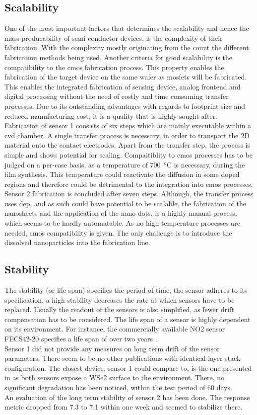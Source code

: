 \subsection{Scalability}
One of the most important factors that determines the scalability and hence the mass producability of semi conductor devices, is the complexity of their fabrication. With the complexity mostly originating from the count the different fabrication methods being used. Another criteria for good scalability is the compatibility to the \gls{cmos} fabrication process. This property enables the fabrication of the target device on the same wafer as \glspl{mosfet} will be fabricated. This enables the integrated fabrication of sensing device, analog frontend and digital processing without the need of costly and time consuming transfer processes. Due to its outstanding advantages with regards to footprint size and reduced manufacturing cost, it is a quality that is highly sought after.\\
Fabrication of sensor 1 consists of six steps which are mainly executable within a \gls{cvd} chamber. A single transfer process is necessary, in order to transport the 2D material onto the contact electrodes. Apart from the transfer step, the process is simple and shows potential for scaling. Compaitiblity to \gls{cmos} processes has to be judged on a per-case basis, as a temperature of \SI{700}{\celsius} is necessary, during the film synthesis. This temperature could reactivate the diffusion in some doped regions and therefore could be detrimental to the integration into \gls{cmos} processes.\\
Sensor 2 fabrication is concluded after seven steps. Although, the transfer process uses \gls{dep}, and as such could have potential to be scalable, the fabrication of the nanosheets and the application of the nano dots, is a highly manual process, which seems to be hardly automatable. As no high temperature processes are needed, \gls{cmos} compatibility is given. The only challenge is to introduce the dissolved nanoparticles into the fabrication line.
\subsection{Stability}
The stability (or life span) specifies the period of time, the sensor adheres to its specification. a high stability decreases the rate at which sensors have to be replaced. Usually the readout of the sensors is also simplified, as fewer drift compensation has to be considered. The life span of a sensor is highly dependent on its environment. For instance, the commercially available NO2 sensor FECS42-20 specifies a life span of over two years \cite{Figaro}. \\ 
Sensor 1 did not provide any measures on long term drift of the sensor parameters. There seem to be no other publications with identical layer stack configuration. The closest device, sensor 1 could compare to, is the one presented in \cite{Wu2020} as both sensors expose a WSe2 surface to the environment. There, no significant degradation has been noticed, within the test period of 60 days. \\
An evaluation of the long term stability of sensor 2 has been done. The response metric dropped from 7.3 to 7.1 within one week and seemed to stabilize there.
